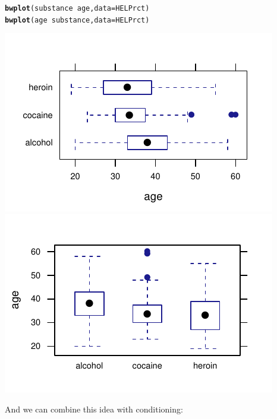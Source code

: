 \documentclass[twoside]{book}\usepackage[]{graphicx}\usepackage[]{xcolor}
\makeatletter
\def\maxwidth{ %
  \ifdim\Gin@nat@width>\linewidth
    \linewidth
  \else
    \Gin@nat@width
  \fi
}
\newcommand{\hlopt}[1]{\textcolor[rgb]{0,0,0}{#1}}%
\newcommand{\hlstd}[1]{\textcolor[rgb]{0.345,0.345,0.345}{#1}}%
\newcommand{\hlkwc}[1]{\textcolor[rgb]{0.333,0.667,0.333}{#1}}%
\newcommand{\hlkwd}[1]{\textcolor[rgb]{0.737,0.353,0.396}{\textbf{#1}}}%
\newenvironment{kframe}{%
 \def\at@end@of@kframe{}%
 \ifinner\ifhmode%
  \def\at@end@of@kframe{\end{minipage}}%
  \begin{minipage}{\columnwidth}%
 \fi\fi%
 \def\FrameCommand##1{\hskip\@totalleftmargin \hskip-\fboxsep
 \colorbox{shadecolor}{##1}\hskip-\fboxsep
     \hskip-\linewidth \hskip-\@totalleftmargin \hskip\columnwidth}%
 \MakeFramed {\advance\hsize-\width
   \@totalleftmargin\z@ \linewidth\hsize
   \@setminipage}}%
 {\par\unskip\endMakeFramed%
 \at@end@of@kframe}
\newenvironment{knitrout}{}{} %
\makeatother
\begin{document}
\begin{knitrout}
\color{fgcolor}\begin{kframe}
\begin{alltt}
\hlkwd{bwplot}\hlstd{(substance} \hlopt{~} \hlstd{age,} \hlkwc{data} \hlstd{= HELPrct)}
\hlkwd{bwplot}\hlstd{(age} \hlopt{~} \hlstd{substance,} \hlkwc{data} \hlstd{= HELPrct)}
\end{alltt}
\end{kframe}

{\centering \includegraphics[width=\maxwidth]{figures/fig-bwplot2-1} 
\includegraphics[width=\maxwidth]{figures/fig-bwplot2-2} 

}



\end{knitrout}
And we can combine this idea with conditioning:
\end{document}
